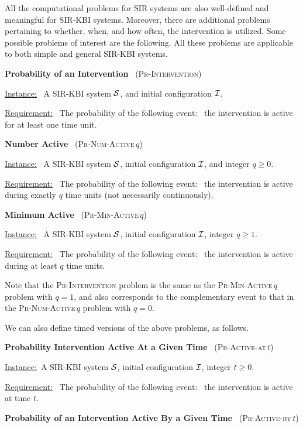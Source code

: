 \documentclass[11pt]{article}
\newcommand{\cali}{\mbox{${\cal I}$}}
\newcommand{\cals}{\mbox{${\cal S}$}}
\newcommand{\Int}{\textsc{Pr-Intervention}}
\newcommand{\tActiveAt}{\mbox{\textsc{Pr-Active-at}$\,t$}}
\newcommand{\tActiveBy}{\mbox{\textsc{Pr-Active-by}$\,t$}}
\newcommand{\NumActive}{\mbox{\textsc{Pr-Num-Active}$\,q$}}
\newcommand{\MinActive}{\mbox{\textsc{Pr-Min-Active}$\,q$}}
\begin{document}
All the computational problems for SIR systems 
are also well-defined and meaningful for SIR-KBI systems.
Moreover, there are additional problems pertaining to  whether, when, and how often,
the intervention is utilized. Some possible problems of interest are the following.
All these problems are applicable to both simple and general SIR-KBI systems.

\bigskip

\noindent
\textbf{Probability of an Intervention}~ (\Int)

\medskip
\noindent
\underline{Instance:}~ A SIR-KBI system \cals,
and initial configuration \cali.

\smallskip
\noindent
\underline{Requirement:}~ The probability of the following
event:~ the intervention is active for at least one time unit.


\bigskip
\noindent
\textbf{Number Active}~ (\NumActive)

\medskip
\noindent
\underline{Instance:}~ A SIR-KBI system \cals,
initial configuration \cali,
and  integer $q \geq 0$.

\smallskip
\noindent
\underline{Requirement:}~ The probability of the following
event:~ the intervention is active during exactly $q$ time units (not necessarily continuously).


\bigskip
\noindent
\textbf{Minimum Active}~ (\MinActive)

\medskip
\noindent
\underline{Instance:}~ A SIR-KBI system \cals,
initial configuration \cali, integer $q \geq 1$.

\smallskip
\noindent
\underline{Requirement:}~ The probability of the following
event:~ the intervention is active during at least $q$ time units.

\medskip
Note that the \Int{} problem is the same as the \MinActive{} problem with $q = 1$,
and also corresponds to the complementary event to that in the  \NumActive{} problem with $q = 0$.

\bigskip
We can also define timed versions of the above problems, as follows.


\bigskip
\noindent
\textbf{Probability Intervention Active At a Given Time}~ (\tActiveAt)

\medskip
\noindent
\underline{Instance:}~A SIR-KBI system \cals,
initial configuration \cali, integer $t \geq 0$.

\smallskip
\noindent
\underline{Requirement:}~ The probability of the following
event:~ the intervention is active at time $t$.


\bigskip
\noindent
\textbf{Probability of an Intervention Active By a Given Time}~ (\tActiveBy)
\end{document}
